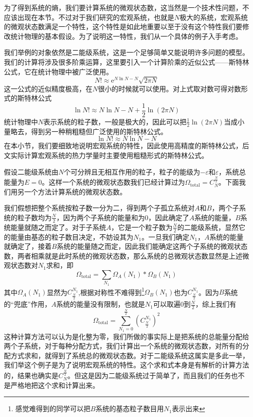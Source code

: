 \documentclass[../../main.tex]{subfiles}
\begin{document}
为了得到系统的熵，我们要计算系统的微观状态数，这当然是一个技术性问题，不应该出现在本节。不过对于我们研究的宏观系统，也就是\(N\)极大的系统，宏观系统的微观状态数满足一个特性，这个特性是如此地重要以至于没有这个特性我们要修改统计物理的基本假设。为了说明这一特性，我们从一个具体的例子入手考虑。

我们举例的对象依然是二能级系统，这是一个足够简单又能说明许多问题的模型。我们的计算将涉及很多阶乘运算，这里要引入一个计算阶乘的近似公式——斯特林公式，它在统计物理中被广泛使用。
\begin{equation*}
    N!\approx \mathrm{e}^{N\ln N-N}\sqrt{2\pi N}
\end{equation*}
这一公式的近似精度极高，在\(N\)很小的时候就可以使用。对上式取对数可得对数形式的斯特林公式
\begin{equation*}
    \ln N! \approx N\ln N-N+\frac{1}{2}\ln(2\pi N)
\end{equation*}
统计物理中\(N\)表示系统的粒子数，一般是极大的，因此可以把\(\frac{1}{2}\ln(2\pi N)\)当成小量略去，得到另一种稍粗糙但广泛使用的斯特林公式。
\begin{equation}
    \ln N! \approx N\ln N-N
\end{equation}
在本小节，我们要细致地说明宏观系统的特性，因此使用高精度的斯特林公式，后文实际计算宏观系统的热力学量时主要使用粗糙形式的斯特林公式。

假设二能级系统由\(N\)个可分辨且无相互作用的粒子，粒子的能级为\(-\varepsilon\)和\(\varepsilon\)，系统总能量为\(E=0\)。这样一个系统的微观状态数我们已经计算过为\(\Omega_{\text{total}}=C_{N}^{\frac{N}{2}}\)。下面我们用另一个方法计算系统的微观状态数。

我们假想把整个系统按粒子数一分为二，得到两个子孤立系统对\(A\)和\(B\)，两个子系统的粒子数均为\(\frac{N}{2}\)，因为两个子系统的能量和为0，因此确定了\(A\)系统的能量，\(B\)系统能量就随之而定了。对于子系统\(A\)，它是一个粒子数为\(\frac{N}{2}\)的二能级系统，显然它的能量由基态的粒子数目决定，不妨设其为\(N_1\)。一旦我们确定\(N_1\)，\(A\)系统的能量就确定了，接着\(B\)系统的能量随之而定，因此我们能确定这两个子系统的微观状态数，两者相乘就是此时系统的微观状态数，那么系统的总微观状态数显然是上述微观状态数对\(N_1\)求和，即\begin{equation*}
    \Omega_{\text{total}}=\sum_{N_1}\Omega_{A}(N_1)*\Omega_{B}(N_1)
\end{equation*}
其中\(\Omega_{A}(N_1)\)显然为\(C_{\frac{N}{2}}^{N_1}\),根据对称性不难得到\footnote{感觉难得到的同学可以把\(B\)系统的基态粒子数目用\(N_1\)表示出来}\(\Omega_{B}(N_1)\)也为\(C_{\frac{N}{2}}^{N_1}\)。因为\(B\)系统的“兜底”作用，\(A\)系统的能量没有限制，也就是\(N_1\)可以取遍\(0\)到\(\frac{N}{2}\)，综上我们有
\begin{equation*}
    \Omega_{\text{total}}=\sum_{N_1=0}^{\frac{N}{2}}\left(C_{\frac{N}{2}}^{N_1}\right)^2
\end{equation*}
这种计算方法可以认为是化整为零，我们所做的事实际上是把系统的总能量分配给两个子系统，对于每种分配方式，我们计算出一个系统的微观状态数，对所有的分配方式求和，就得到了系统总的微观状态数。对于二能级系统这属实是多此一举，我们举这个例子是为了说明宏观系统的特性。这个求和式本身是有解析的计算方法的，结果也确实是\(C_{N}^{\frac{N}{2}}\)。但这是因为二能级系统过于简单了，而且我们的任务也不是严格地把这个求和计算出来。
\end{document}
